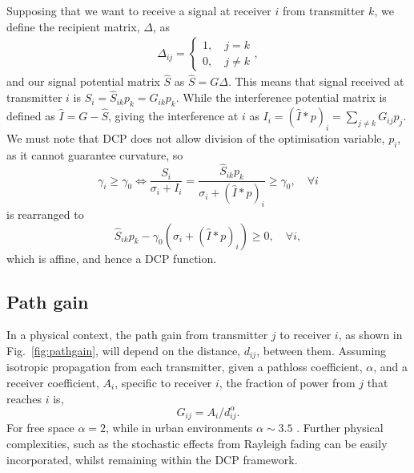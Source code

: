 \documentclass[twocolumn,secnumarabic,amssymb, nobibnotes, aps, prl,superscriptaddress]{revtex4-1}
\begin{document}
Supposing that we want to receive a signal at receiver $i$ from transmitter $k$, we define the recipient matrix, $\Delta$, as
\begin{align*}
\Delta_{ij} = \begin{cases}
1, \quad j=k\\
0, \quad j\neq k
\end{cases},
\end{align*}
and our signal potential matrix $\hat{S}$ as $\hat{S} = G\Delta$.  This means that signal received at transmitter $i$ is $S_i = \hat{S}_{ik}p_k = G_{ik}p_k$.
While the interference potential matrix is defined as $\hat{I} = G-\hat{S}$, giving the interference at $i$ as $I_i = (\hat{I}*p)_i = \sum_{j\neq k}G_{ij}p_j$. We must note that DCP does not allow division of the optimisation variable, $p_i$, as it cannot guarantee curvature, so  
\begin{equation*}
  \gamma_i \geqslant \gamma_0\Longleftrightarrow  \frac{S_i}{\sigma_i + I_i} = \frac{\hat{S}_{ik}p_k}{\sigma_i+(\hat{I}*p)_i} \geqslant \gamma_0, \quad \forall i
\end{equation*}
is rearranged to
\begin{equation*}
\hat{S}_{ik}p_k-\gamma_0(\sigma_i + (\hat{I}*p)_i)\geqslant 0, \quad \forall i,
\end{equation*} 
which is affine, and hence a DCP function.

\subsection{Path gain}
\noindent In a physical context, the path gain from transmitter $j$ to receiver $i$, as shown in Fig.~\ref{fig:pathgain}, will depend on the distance, $d_{ij}$, between them. Assuming isotropic propagation from each transmitter, given a pathloss coefficient, $\alpha$, and a receiver coefficient, $A_i$, specific to receiver $i$, the fraction of power from $j$ that reaches $i$ is,
\begin{equation}
G_{ij} = A_i/d_{ij}^\alpha.
\end{equation}
For free space $\alpha = 2$, while in urban environments $\alpha \sim 3.5$ \cite{hata1980}. Further physical complexities, such as the stochastic effects from Rayleigh fading can be easily incorporated, whilst remaining within the DCP framework.
\end{document}
